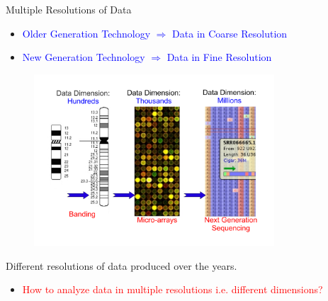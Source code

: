 \documentclass[first=orange,second=purple,logo=redexc]{aaltoslides}
\begin{document}
\begin{frame}{Multiple Resolutions of Data }

\begin{itemize}
 \item \scriptsize \textcolor {blue} {Older Generation Technology $\Rightarrow $ Data in Coarse Resolution}
 \item \scriptsize \textcolor {blue} {New Generation Technology $\Rightarrow $ Data in Fine Resolution}
 \end{itemize}


\vspace{-3mm}

\begin{figure}
\includegraphics[trim=1.2cm 0cm 0cm 1cm,clip=true, width=0.8\textwidth]{figures/multires}
\end{figure}

\vspace{-5mm}

\hspace{20mm}\scriptsize  Different resolutions of data produced over the years.

 \begin{itemize}
 \item \textcolor {red} {How to analyze data in multiple resolutions i.e. different dimensions?}
\end{itemize}




\end{frame}
\end{document}
